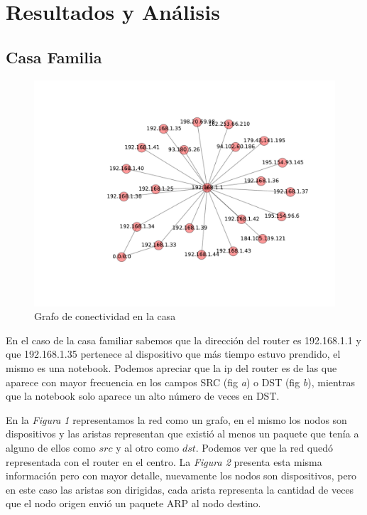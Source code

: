 \section{Resultados y An\'alisis}

\subsection{Casa Familia}

\begin{figure}[h!]
    \begin{center}
        \includegraphics[scale=.6]{resultados/casa/conectividadNX.pdf}
		  \caption{Grafo de conectividad en la casa}
	\end{center}
\end{figure}
	
En el caso de la casa familiar sabemos que la direcci\'on del router
es 192.168.1.1 y que 192.168.1.35 pertenece al dispositivo que m\'as tiempo estuvo
prendido, el mismo es una notebook. Podemos apreciar que la ip del
router es de las que aparece con mayor frecuencia en los campos SRC (fig \emph{a}) 
o DST (fig \emph{b}), mientras que la notebook solo aparece un alto n\'umero de 
veces en DST. 

En la \emph{Figura 1} representamos la red como un grafo, en el mismo los
nodos son dispositivos y las aristas representan que existi\'o al menos
un paquete que ten\'ia a alguno de ellos como $src$ y al otro como $dst$.
Podemos ver que la red qued\'o representada con el router en el centro.
La \emph{Figura 2} presenta esta misma informaci\'on
pero con mayor detalle, nuevamente los nodos son dispositivos, pero en este
caso las aristas son dirigidas, cada arista representa la cantidad de veces
que el nodo origen envi\'o un paquete ARP al nodo destino.

